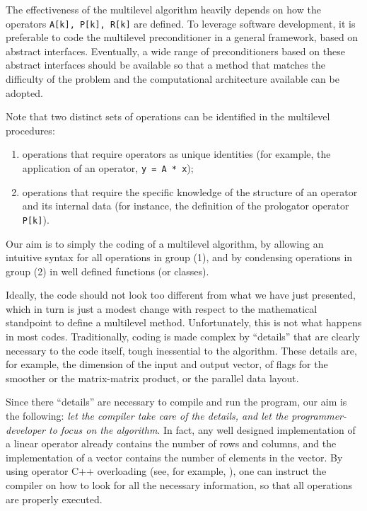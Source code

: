 \documentclass{article}[11pt]
\begin{document}
The effectiveness of the multilevel algorithm heavily depends on 
how the operators \verb!A[k], P[k], R[k]! are defined. To leverage software
development, it is preferable to code the multilevel preconditioner in a
general framework, based on abstract interfaces. Eventually, a  wide range
of preconditioners based on these abstract interfaces should be available so
that a method that matches the difficulty of the problem and the computational
architecture available can be adopted.

\smallskip

Note that two distinct sets of operations can be identified in the multilevel
procedures:
\begin{enumerate}
\item operations that require operators as unique identities (for example,
  the application of an operator, \verb!y = A * x!);
\item operations that require the specific knowledge of the structure
  of an operator and its internal data (for instance, the definition of the
  prologator operator \verb!P[k]!).
\end{enumerate}

Our aim is to simply the coding of a multilevel algorithm, by allowing
an intuitive syntax for all operations in group (1), and by condensing
operations in group (2) in well defined functions (or classes). 

Ideally, the
code should not look too different from what we have just presented, which
in turn is just a modest change with respect to the mathematical standpoint
to define a multilevel method. Unfortunately, this is not what happens in most
codes.
Traditionally, coding is made complex by ``details'' that are 
clearly necessary to the code itself, tough inessential to the algorithm. 
These details are, for
example, the dimension of the input and output vector, of flags for the
smoother or the matrix-matrix product, or the parallel data layout.

Since there ``details'' are necessary to compile and run the program, 
  our aim is the following: {\em let the
compiler take care of the details, and let the programmer-developer to
focus on the algorithm}. In fact, any well designed implementation of a linear
operator already contains the number of rows and columns, and the
implementation of a vector contains the number of elements in the vector.
By using operator C++ overloading (see, for example, \cite{stroustrup91cpp}), 
  one can instruct the compiler on how to
look for all the necessary information, so that all operations are properly
executed.
\end{document}
